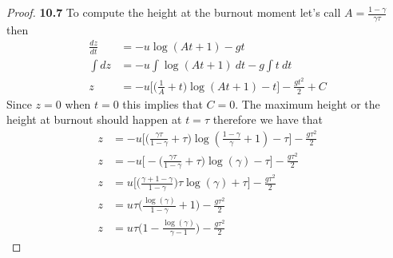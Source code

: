 \documentclass[11pt]{article}
\theoremstyle{definition}
\begin{document}
\begin{proof}{\textbf{10.7}}
        To compute the height at the burnout moment let's call
        $A = \frac{1 - \gamma}{\gamma\tau}$ then
        \begin{align*}
            \frac{dz}{dt} &= -u\log(At + 1) - gt\\
            \int dz &= -u\int \log(At + 1)~dt - g \int t~dt\\
            z &= -u\bigg[\bigg(\frac{1}{A} + t\bigg)\log(At+1) - t\bigg]
            - \frac{gt^2}{2} + C
        \end{align*}
        Since $z=0$ when $t=0$ this implies that $C=0$.
        The maximum height or the height at burnout should happen at $t=\tau$
        therefore we have that
        \begin{align*}
            z &= -u\bigg[\bigg(\frac{\gamma\tau}{1-\gamma} + \tau\bigg)\log(
                \frac{1-\gamma}{\gamma}+1)- \tau\bigg] - \frac{g\tau^2}{2}\\
            z &= -u\bigg[-\bigg(\frac{\gamma\tau}{1-\gamma} + \tau\bigg)\log(\gamma)
                - \tau\bigg] - \frac{g\tau^2}{2}\\
            z &= u\bigg[\bigg(\frac{\gamma + 1 - \gamma}{1-\gamma}\bigg)\tau\log(\gamma)
                + \tau\bigg] - \frac{g\tau^2}{2}\\
            z &= u\tau\bigg(\frac{\log(\gamma)}{1-\gamma} + 1\bigg)
                - \frac{g\tau^2}{2}\\
            z &= u\tau\bigg(1 - \frac{\log(\gamma)}{\gamma-1}\bigg)
                - \frac{g\tau^2}{2}
        \end{align*}
    \end{proof}
\end{document}
